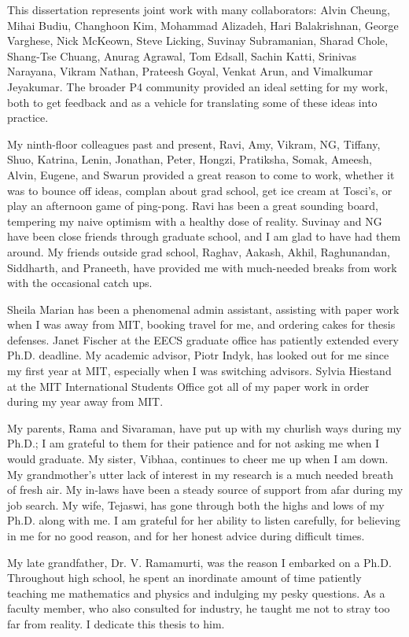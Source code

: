 This dissertation represents joint work with many collaborators: Alvin Cheung,
Mihai Budiu, Changhoon Kim, Mohammad Alizadeh, Hari Balakrishnan, George
Varghese, Nick McKeown, Steve Licking, Suvinay Subramanian, Sharad Chole,
Shang-Tse Chuang, Anurag Agrawal, Tom Edsall, Sachin Katti, Srinivas Narayana,
Vikram Nathan, Prateesh Goyal, Venkat Arun, and Vimalkumar Jeyakumar. The
broader P4 community provided an ideal setting for my work, both to get
feedback and as a vehicle for translating some of these ideas into practice. 

My ninth-floor colleagues past and present, Ravi, Amy, Vikram, NG, Tiffany,
Shuo, Katrina, Lenin, Jonathan, Peter, Hongzi, Pratiksha, Somak, Ameesh, Alvin,
Eugene, and Swarun provided a great reason to come to work, whether it was to
bounce off ideas, complan about grad school, get ice cream at Tosci's, or play
an afternoon game of ping-pong. Ravi has been a great sounding board, tempering
my naive optimism with a healthy dose of reality. Suvinay and NG have been
close friends through graduate school, and I am glad to have had them around.
My friends outside grad school, Raghav, Aakash, Akhil, Raghunandan, Siddharth,
and Praneeth, have provided me with much-needed breaks from work with the
occasional catch ups.

Sheila Marian has been a phenomenal admin assistant, assisting with paper work
when I was away from MIT, booking travel for me, and ordering cakes for thesis
defenses. Janet Fischer at the EECS graduate office has patiently extended
every Ph.D.  deadline. My academic advisor, Piotr Indyk, has looked out for me
since my first year at MIT, especially when I was switching advisors.  Sylvia
Hiestand at the MIT International Students Office got all of my paper work in
order during my year away from MIT.

My parents, Rama and Sivaraman, have put up with my churlish ways during my
Ph.D.; I am grateful to them for their patience and for not asking me when I
would graduate. My sister, Vibhaa, continues to cheer me up when I am down.  My
grandmother's utter lack of interest in my research is a much needed breath of
fresh air. My in-laws have been a steady source of support from afar during my
job search. My wife, Tejaswi, has gone through both the highs and lows of my
Ph.D. along with me. I am grateful for her ability to listen carefully, for
believing in me for no good reason, and for her honest advice during difficult
times. 

My late grandfather, Dr. V. Ramamurti, was the reason I embarked on a Ph.D.
Throughout high school, he spent an inordinate amount of time patiently
teaching me mathematics and physics and indulging my pesky questions. As a
faculty member, who also consulted for industry, he taught me not to stray too
far from reality. I dedicate this thesis to him.
